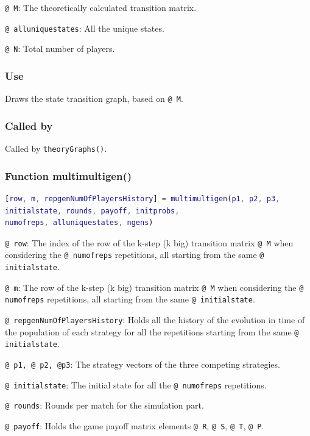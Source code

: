 \documentclass[12pt]{report}
\begin{document}
\texttt{@ M}: The theoretically calculated transition matrix.

\texttt{@ alluniquestates}: All the unique states.

\texttt{@ N}: Total number of players.

\subsubsection*{Use }
Draws the state transition graph, based on \texttt{@ M}.

\subsubsection*{Called by}
Called by \texttt{theoryGraphs()}.








\subsubsection*{Function multimultigen()}

\begin{lstlisting}[language=Matlab]
[row, m, repgenNumOfPlayersHistory] = multimultigen(p1, p2, p3,
initialstate, rounds, payoff, initprobs, 
numofreps, alluniquestates, ngens)

\end{lstlisting}

\texttt{@ row}: The index of the row of the k-step (k big) transition matrix \texttt{@ M} when considering the \texttt{@ numofreps} repetitions, all starting from the same \texttt{@ initialstate}. 

\texttt{@ m}: The row of the k-step (k big) transition matrix \texttt{@ M} when considering the \texttt{@ numofreps} repetitions, all starting from the same \texttt{@ initialstate}.

\texttt{@ repgenNumOfPlayersHistory}: Holds all the history of the evolution in time of the population of each strategy for all the repetitions starting from the same \texttt{@ initialstate}.

\texttt{@ p1, @ p2, @p3}: The strategy vectors of the three competing strategies.

\texttt{@ initialstate}: The initial state for all the \texttt{@ numofreps} repetitions.

\texttt{@ rounds}: Rounds per match for the simulation part.

\texttt{@ payoff}: Holds the game payoff matrix elements \texttt{@ R}, \texttt{@ S}, \texttt{@ T}, \texttt{@ P}. 
\end{document}
